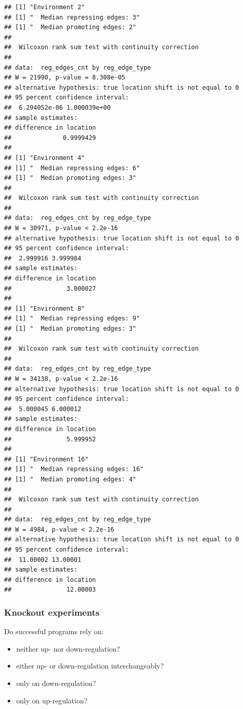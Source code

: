 \documentclass[]{book}
\providecommand{\tightlist}{%
  \setlength{\itemsep}{0pt}\setlength{\parskip}{0pt}}
\begin{document}
\begin{verbatim}
## [1] "Environment 2"
## [1] "  Median repressing edges: 3"
## [1] "  Median promoting edges: 2"
## 
##  Wilcoxon rank sum test with continuity correction
## 
## data:  reg_edges_cnt by reg_edge_type
## W = 21990, p-value = 8.308e-05
## alternative hypothesis: true location shift is not equal to 0
## 95 percent confidence interval:
##  6.294052e-06 1.000039e+00
## sample estimates:
## difference in location 
##              0.9999429 
## 
## [1] "Environment 4"
## [1] "  Median repressing edges: 6"
## [1] "  Median promoting edges: 3"
## 
##  Wilcoxon rank sum test with continuity correction
## 
## data:  reg_edges_cnt by reg_edge_type
## W = 30971, p-value < 2.2e-16
## alternative hypothesis: true location shift is not equal to 0
## 95 percent confidence interval:
##  2.999916 3.999984
## sample estimates:
## difference in location 
##               3.000027 
## 
## [1] "Environment 8"
## [1] "  Median repressing edges: 9"
## [1] "  Median promoting edges: 3"
## 
##  Wilcoxon rank sum test with continuity correction
## 
## data:  reg_edges_cnt by reg_edge_type
## W = 34138, p-value < 2.2e-16
## alternative hypothesis: true location shift is not equal to 0
## 95 percent confidence interval:
##  5.000045 6.000012
## sample estimates:
## difference in location 
##               5.999952 
## 
## [1] "Environment 16"
## [1] "  Median repressing edges: 16"
## [1] "  Median promoting edges: 4"
## 
##  Wilcoxon rank sum test with continuity correction
## 
## data:  reg_edges_cnt by reg_edge_type
## W = 4984, p-value < 2.2e-16
## alternative hypothesis: true location shift is not equal to 0
## 95 percent confidence interval:
##  11.00002 13.00001
## sample estimates:
## difference in location 
##               12.00003
\end{verbatim}

\hypertarget{knockout-experiments}{%
\subsubsection{Knockout experiments}\label{knockout-experiments}}

Do successful programs rely on:

\begin{itemize}
\tightlist
\item
  neither up- nor down-regulation?
\item
  either up- or down-regulation interchangeably?
\item
  only on down-regulation?
\item
  only on up-regulation?
\end{itemize}
\end{document}
